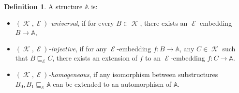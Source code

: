 \documentclass[11pt]{amsart}
\theoremstyle{definition}
\newtheorem{defin}[thm]{Definition}
\DeclareMathOperator{\B}{\mathcal B}
\DeclareMathOperator{\K}{\mathcal K}
\DeclareMathOperator{\E}{\mathcal E}
\begin{document}
\begin{defin}A structure $\mathbb A$ is:
	\begin{itemize}
		\item \emph{$(\K,\E)$-universal}, if for every $B \in \K$, there exists an $\E$-embedding $B \longrightarrow \mathbb A$,
		\item \emph{$(\K,\E)$-injective}, if for any
        $\E$-embedding $f:B\longrightarrow \mathbb A$, any $C \in \K$ such that $B\sqsubseteq_{\E} C$, there exists an extension of $f$ to an $\E$-embedding $\overline{f}:C\longrightarrow \mathbb A$.
        
		\begin{center}
	    \end{center}
		
		\item \emph{$(\K,\E)$-homogeneous}, if any isomorphism between substructures $B_0,B_1 \sqsubseteq_{\E} \mathbb A$ can be extended to an automorphism of $\mathbb A$.
        \begin{center}
		
		
	\end{center}
        

	\end{itemize}
\end{defin}
 
\end{document}
